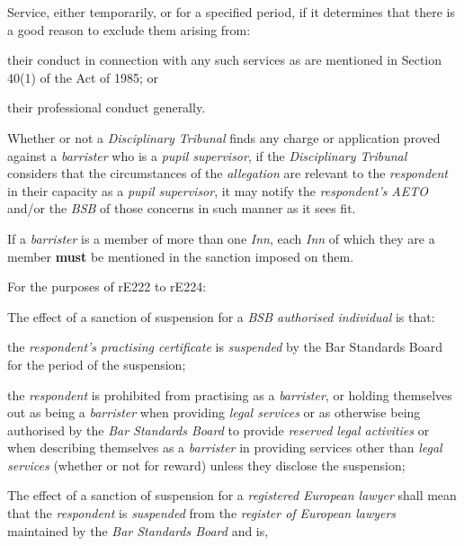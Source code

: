 Service, either temporarily, or for a specified period, if it determines
that there is a good reason to exclude them arising from:\al
\item their conduct in connection with any such services as are mentioned
in Section 40(1) of the Act of 1985; or\\
\item their professional conduct generally.\la\ln
{}\par
Whether or not a \emph{Disciplinary Tribunal} finds any charge or
application proved against a \emph{barrister} who is a \emph{pupil
supervisor}, if the \emph{Disciplinary Tribunal} considers that the
circumstances of the \emph{allegation} are relevant to
the\emph{ respondent} in their capacity as a \emph{pupil supervisor}, it
may notify the \emph{respondent's} \emph{AETO} and/or the \emph{BSB }of
those concerns in such manner as it sees fit.\\
\par
If a \emph{barrister} is a member of more than one \emph{Inn},
each \emph{Inn }of which they are a member  \textcolor{myred}{\textbf{must}} be mentioned in the
sanction imposed on them.\\
\par
{}
For the purposes of rE222 to rE224:\\\nl \item The effect of a sanction of suspension for a \emph{BSB authorised
individual} is that:\al
\item the \emph{respondent's} \emph{practising
certificate} is \emph{suspended} by the Bar Standards Board for the
period of the suspension;\\
\item  the \emph{respondent} is prohibited from practising as
a \emph{barrister}, or holding themselves out as being
a \emph{barrister }when providing \emph{legal services} or as otherwise
being authorised by the \emph{Bar Standards Board} to
provide \emph{reserved} \emph{legal activities }or when describing
themselves as a \emph{barrister} in providing services other
than \emph{legal services} (whether or not for reward) unless they
disclose the suspension;\la
\item The effect of a sanction of suspension for a \emph{registered
European lawyer} shall mean that
the \emph{respondent} is \emph{suspended} from the \emph{register of
European lawyers} maintained by the \emph{Bar Standards Board} and is,
